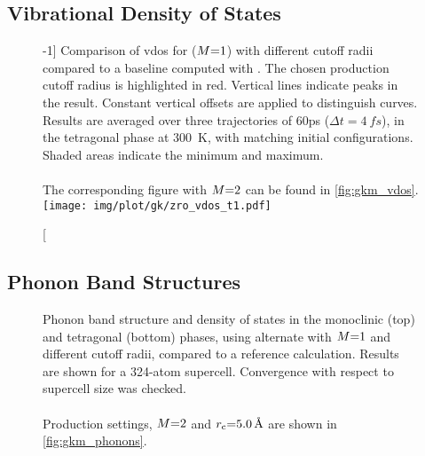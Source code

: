 \subsection{Vibrational Density of States}
\begin{figure}
  \centering
  \caption[][-1\baselineskip]{
  Comparison of \gls{vdos} for \mpnns{} ($M{=}1$) with different cutoff radii compared to a baseline computed with \aims. The chosen production cutoff radius is highlighted in red.
  Vertical lines indicate peaks in the \aims result. Constant vertical offsets are applied to distinguish curves. Results are averaged over three trajectories of \si{60}{ps} ($\Delta t{=}\SI{4}{fs}$), in the tetragonal phase at \SI{300}{K}, with matching initial configurations. Shaded areas indicate the minimum and maximum.
  \\\\
  The corresponding figure with $M{=}2$ can be found in \cref{fig:gkm_vdos}.
  }
  \label{fig:si-gkm_vdos_t1}
  \texttt{[image: img/plot/gk/zro\_vdos\_t1.pdf]}
\end{figure}

\clearpage
\subsection{Phonon Band Structures}

\begin{figure}
  \centering


  \caption{
  Phonon band structure and density of states in the monoclinic (top) and tetragonal (bottom) phases, using alternate \schnet \mlps with $M{=}1$ and different cutoff radii, compared to a \aims reference calculation.
  Results are shown for a 324-atom supercell. Convergence with respect to supercell size was checked.
  \\\\
  Production settings, $M{=}2$ and $r_{\text{c}}{=}\qty{5.0}{\angstrom}$ are shown in \cref{fig:gkm_phonons}.  
  }
  \label{fig:si-gkm_phonons_m1}
\end{figure}

